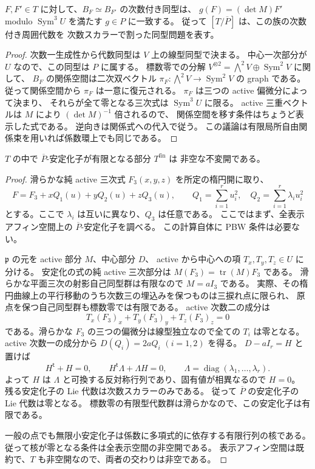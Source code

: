 \begin{proposition}[表示空間の同型問題の忠実性]
\label{prop:nfm-graded-presentation}
$F,F'\in T$ に対して、$B_F\simeq B_{F'}$ の次数付き同型は、
$g(F)=(\det M)F'$ modulo $\operatorname{Sym}^3U$ を満たす $g\in P$ に一致する。
従って $[T/\overline P]$ は、この族の次数付き周囲代数を
次数スカラーで割った同型問題を表す。
\end{proposition}

\begin{proof}
次数一生成性から代数同型は $V$ 上の線型同型で決まる。
中心一次部分が $U$ なので、この同型は $P$ に属する。
標数零での分解 $V^{\otimes2}=\bigwedge^2V\oplus\operatorname{Sym}^2V$ に関して、
$B_F$ の関係空間は二次双ベクトル
$\pi_F:\bigwedge^2V\to\operatorname{Sym}^2V$ の graph である。
従って関係空間から $\pi_F$ は一意に復元される。
$\pi_F$ は三つの active 偏微分によって決まり、
それらが全て零となる三次式は $\operatorname{Sym}^3U$ に限る。
active 三重ベクトルは $M$ により $(\det M)^{-1}$ 倍されるので、
関係空間を移す条件はちょうど表示した式である。
逆向きは関係式への代入で従う。
この議論は有限局所自由関係束を用いれば係数環上でも同じである。
\end{proof}

\begin{lemma}[有限安定化子を持つ点]
\label{lem:nfm-finite-stabilizer}
$T$ の中で $\overline P$-安定化子が有限となる部分 $T^{\mathrm{fin}}$ は
非空な不変開である。
\end{lemma}

\begin{proof}
滑らかな純 active 三次式 $F_3(x,y,z)$ を所定の楕円開に取り、
\[
 F=F_3+xQ_1(u)+yQ_2(u)+zQ_3(u),\qquad
 Q_1=\sum_{i=1}^r u_i^2,\quad Q_2=\sum_{i=1}^r\lambda_i u_i^2
\]
とする。ここで $\lambda_i$ は互いに異なり、$Q_3$ は任意である。
ここではまず、全表示アフィン空間上の $\overline P$-安定化子を調べる。
この計算自体に PBW 条件は必要ない。

$\mathfrak p$ の元を active 部分 $M$、中心部分 $D$、
active から中心への項 $T_x,T_y,T_z\in U$ に分ける。
安定化の式の純 active 三次部分は
$M(F_3)=\operatorname{tr}(M)F_3$ である。
滑らかな平面三次の射影自己同型群は有限なので $M=aI_3$ である。
実際、その楕円曲線上の平行移動のうち次数三の埋込みを保つものは三捩れ点に限られ、
原点を保つ自己同型群も標数零では有限である。
active 次数二の成分は
\[
 T_x(F_3)_x+T_y(F_3)_y+T_z(F_3)_z=0
\]
である。滑らかな $F_3$ の三つの偏微分は線型独立なので全ての $T_i$ は零となる。
active 次数一の成分から $D(Q_i)=2aQ_i$ $(i=1,2)$ を得る。
$D-aI_r=H$ と置けば
\[
 H^{\mathsf t}+H=0,\qquad
 H^{\mathsf t}\Lambda+\Lambda H=0,
 \qquad \Lambda=\operatorname{diag}(\lambda_1,\ldots,\lambda_r).
\]
よって $H$ は $\Lambda$ と可換する反対称行列であり、固有値が相異なるので $H=0$。
残る安定化子の Lie 代数は次数スカラーのみである。
従って $\overline P$ の安定化子の Lie 代数は零となる。
標数零の有限型代数群は滑らかなので、この安定化子は有限である。

一般の点でも無限小安定化子は係数に多項式的に依存する有限行列の核である。
従って核が零となる条件は全表示空間の非空開である。
表示アフィン空間は既約で、$T$ も非空開なので、両者の交わりは非空である。
\end{proof}

